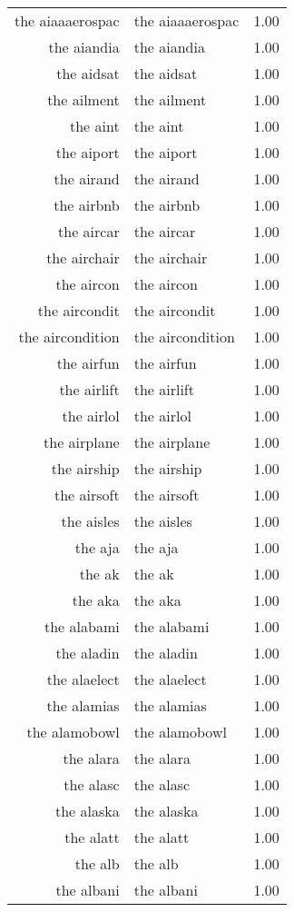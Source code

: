 \begin{table}[ht]
\begin{tabular}{rlr}
  the aiaaaerospac & the aiaaaerospac & 1.00 \\ 
  the aiandia & the aiandia & 1.00 \\ 
  the aidsat & the aidsat & 1.00 \\ 
  the ailment & the ailment & 1.00 \\ 
  the aint & the aint & 1.00 \\ 
  the aiport & the aiport & 1.00 \\ 
  the airand & the airand & 1.00 \\ 
  the airbnb & the airbnb & 1.00 \\ 
  the aircar & the aircar & 1.00 \\ 
  the airchair & the airchair & 1.00 \\ 
  the aircon & the aircon & 1.00 \\ 
  the aircondit & the aircondit & 1.00 \\ 
  the aircondition & the aircondition & 1.00 \\ 
  the airfun & the airfun & 1.00 \\ 
  the airlift & the airlift & 1.00 \\ 
  the airlol & the airlol & 1.00 \\ 
  the airplane & the airplane & 1.00 \\ 
  the airship & the airship & 1.00 \\ 
  the airsoft & the airsoft & 1.00 \\ 
  the aisles & the aisles & 1.00 \\ 
  the aja & the aja & 1.00 \\ 
  the ak & the ak & 1.00 \\ 
  the aka & the aka & 1.00 \\ 
  the alabami & the alabami & 1.00 \\ 
  the aladin & the aladin & 1.00 \\ 
  the alaelect & the alaelect & 1.00 \\ 
  the alamias & the alamias & 1.00 \\ 
  the alamobowl & the alamobowl & 1.00 \\ 
  the alara & the alara & 1.00 \\ 
  the alasc & the alasc & 1.00 \\ 
  the alaska & the alaska & 1.00 \\ 
  the alatt & the alatt & 1.00 \\ 
  the alb & the alb & 1.00 \\ 
  the albani & the albani & 1.00 \\ 

\end{tabular}
\end{table}
